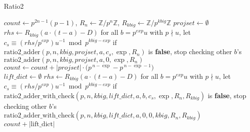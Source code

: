 \documentclass[letterpaper,12pt]{article}
\begin{document}
\begin{algorithm}[H]
\caption{Ratio2}
\begin{algorithmic}[1]
    \State $count \gets p^{2n-1}(p-1)$, $R_n \gets \mathbb{Z}/p^n\mathbb{Z}$, $R_{kbig} \gets \mathbb{Z}/p^{kbig}\mathbb{Z}$
        \State $projset \gets \emptyset$
            \State $rhs \gets R_{kbig}(a \cdot (t-a) - D)$
                    \State for all $b = p^{exp}u$ with $p \nmid u$, let $c_s \equiv (rhs/p^{exp})u^{-1} \bmod p^{kbig-exp}$
                    \State if $\mathrm{ratio2\_adder}(p,n,kbig,projset,a,c_s,\exp,R_n)$ is \textbf{false}, stop checking other $b$'s
                \EndIf
            \Else
                \State $\mathrm{ratio2\_adder}(p,n,kbig,projset,a,0,\exp,R_n)$
            \EndIf
        \EndFor
        \State $count \gets count + |projset| \cdot \big(p^{\,n-\exp} - p^{\,n-\exp-1}\big)$
    \EndFor \\
    \State $lift\_dict \gets \emptyset$
        \State $rhs \gets R_{kbig}(a \cdot (t-a) - D)$
                \State for all $b = p^{exp}u$ with $p \nmid u$, let $c_s \equiv (rhs/p^{exp})u^{-1} \bmod p^{kbig-exp}$
                \State if $\mathrm{ratio2\_adder\_with\_check}(p,n,kbig,lift\_dict,a,b,c_s,\exp,R_n, R_{kbig})$ is \textbf{false}, stop checking other $b$'s
            \EndFor
        \Else
            \State $\mathrm{ratio2\_adder\_with\_check}(p,n,kbig,lift\_dict,a,0,0,kbig,R_n,R_{kbig})$
        \EndIf
    \EndFor
    \State \Return $count + |\mathrm{lift\_dict}|$
\EndFunction
\end{algorithmic}
\end{algorithm}

\end{document}
